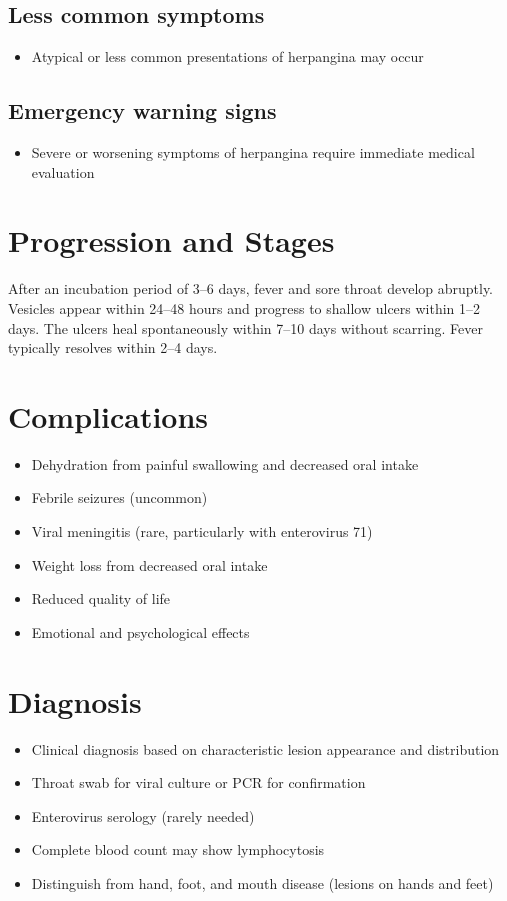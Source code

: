 \subsection{Less common symptoms}
\begin{itemize}[noitemsep]
  \item Atypical or less common presentations of herpangina may occur
\end{itemize}

\subsection{Emergency warning signs}
\begin{itemize}[noitemsep]
  \item Severe or worsening symptoms of herpangina require immediate medical evaluation
\end{itemize}
\section{Progression and Stages}
After an incubation period of 3--6 days, fever and sore throat develop abruptly. Vesicles appear within 24--48 hours and progress to shallow ulcers within 1--2 days. The ulcers heal spontaneously within 7--10 days without scarring. Fever typically resolves within 2--4 days.

\section{Complications}

\begin{itemize}[noitemsep]
  \item Dehydration from painful swallowing and decreased oral intake
  \item Febrile seizures (uncommon)
  \item Viral meningitis (rare, particularly with enterovirus 71)
  \item Weight loss from decreased oral intake
  \item Reduced quality of life
  \item Emotional and psychological effects
\end{itemize}

\section{Diagnosis}

\begin{itemize}[noitemsep]
  \item Clinical diagnosis based on characteristic lesion appearance and distribution
  \item Throat swab for viral culture or PCR for confirmation
  \item Enterovirus serology (rarely needed)
  \item Complete blood count may show lymphocytosis
  \item Distinguish from hand, foot, and mouth disease (lesions on hands and feet)
\end{itemize}

